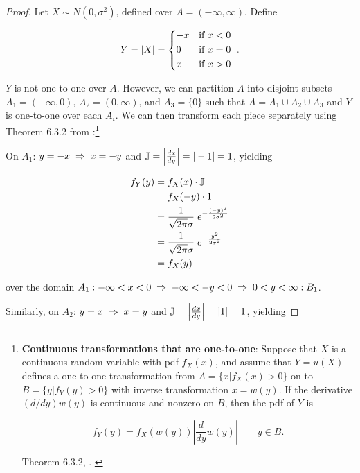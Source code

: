 \documentclass{article}
\begin{document}
\begin{proof}
  Let $X \sim N(0, \sigma^2)$, defined over $A = (-\infty, \infty)$. Define 
  
  \begin{equation*}
    Y = |X| =
    \begin{dcases*}
      -x & if $x < 0$ \\
      0 & if $x = 0$ \\
      x & if $x > 0$ \\
    \end{dcases*}
    .
  \end{equation*}

  $Y$ is not one-to-one over $A$. However, we can partition $A$ into disjoint
  subsets $A_1 = (-\infty, 0)$, $A_2 = (0, \infty)$, and $A_3 = \{0\}$ such
  that $A = A_1 \cup A_2 \cup A_3$ and $Y$ is one-to-one over each $A_i$. We
  can then transform each piece separately using Theorem 6.3.2 from
  \citet{textbook}:\footnote{\textbf{Continuous transformations that are
  one-to-one}: Suppose that $X$ is a continuous random variable with pdf
  $f_X(x)$, and assume that $Y = u(X)$ defines a one-to-one transformation from
  $A = \{x|f_X(x) > 0\}$ on to $B = \{y|f_Y(y) > 0\}$ with inverse
  transformation $x = w(y)$. If the derivative $(d/dy)w(y)$ is continuous and
  nonzero on $B$, then the pdf of $Y$ is

  \begin{equation}
    \label{eq:transformations-1-to-1}
    f_Y(y) = f_X(w(y)) \left| \frac{d}{dy} w(y) \right| \qquad y \in B.
  \end{equation}

  Theorem 6.3.2, \citet{textbook}.
  \label{fnote:transformations-1-to-1}
  }

  On $A_1$: $y = -x \;\Rightarrow\; x = -y$ and $\mathbb{J} = \left| \frac{dx}{dy} \right| = |-1|
  = 1$, yielding

  \begin{align*}
    f_Y(y) &= f_X(x) \cdot \mathbb{J} \\
    &= f_X(-y) \cdot 1 \\
    &= \frac{1}{\sqrt{2\pi}\sigma} \; e^{-\frac{(-y)^2}{2\sigma^2}} \\
    &= \frac{1}{\sqrt{2\pi}\sigma} \; e^{-\frac{y^2}{2\sigma^2}} \\
    &= f_X(y)
  \end{align*}

  over the domain $A_1: -\infty < x < 0 \;\Rightarrow\; -\infty < -y < 0 \;\Rightarrow\; 0 < y < \infty :B_1$.

  Similarly, on $A_2$: $y = x \;\Rightarrow\; x = y$ and $\mathbb{J} = \left| \frac{dx}{dy}
  \right| = |1| = 1$, yielding


\end{proof}
\end{document}
